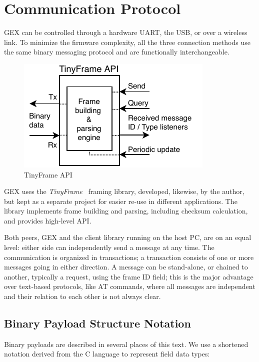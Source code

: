 \chapter{Communication Protocol} \label{sec:tinyframe}

GEX can be controlled through a hardware \gls{UART}, the \gls{USB}, or over a wireless link. To minimize the firmware complexity, all the three connection methods use the same binary messaging protocol and are functionally interchangeable.

\begin{figure}
	\vspace{-1em}
	\centering
	\includegraphics[scale=1]{img/tf-conceptual.pdf}
	\caption{\label{fig:tf_conceptual}TinyFrame API}
\end{figure}

GEX uses the \textit{TinyFrame}~\cite{tinyframerepo} framing library, developed, likewise, by the author, but kept as a separate project for easier re-use in different applications. The library implements frame building and parsing, including checksum calculation, and provides high-level \gls{API}.

Both peers, GEX and the client library running on the host \gls{PC}, are on an equal level: either side can independently send a message at any time. The communication is organized in transactions; a transaction consists of one or more messages going in either direction. A message can be stand-alone, or chained to another, typically a request, using the frame ID field; this is the major advantage over text-based protocols, like AT commands, where all messages are independent and their relation to each other is not always clear.

\section{Binary Payload Structure Notation}

Binary payloads are described in several places of this text. We use a shortened notation derived from the C language to represent field data types:


